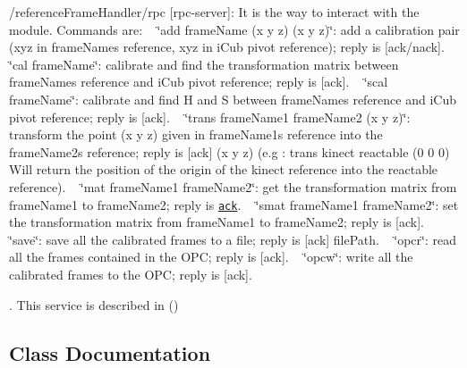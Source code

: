 \begin{DoxyItemize}
\item /reference\+Frame\+Handler/rpc \mbox{[}rpc-\/server\mbox{]}\+: It is the way to interact with the module. Commands are\+: ~\newline
 \char`\"{}add frame\+Name (x y z) (x\textquotesingle{} y\textquotesingle{} z\textquotesingle{})\char`\"{}\+: add a calibration pair (xyz in frame\+Name\textquotesingle{}s reference, x\textquotesingle{}y\textquotesingle{}z\textquotesingle{} in i\+Cub pivot reference); reply is \mbox{[}ack/nack\mbox{]}. ~\newline
 \char`\"{}cal frame\+Name\char`\"{}\+: calibrate and find the transformation matrix between frame\+Name\textquotesingle{}s reference and i\+Cub pivot reference; reply is \mbox{[}ack\mbox{]}. ~\newline
 \char`\"{}scal frame\+Name\char`\"{}\+: calibrate and find H and S between frame\+Name\textquotesingle{}s reference and i\+Cub pivot reference; reply is \mbox{[}ack\mbox{]}. ~\newline
 \char`\"{}trans frame\+Name1 frame\+Name2 (x y z)\char`\"{}\+: transform the point (x y z) given in frame\+Name1\textquotesingle{}s reference into the frame\+Name2\textquotesingle{}s reference; reply is \mbox{[}ack\mbox{]} (x\textquotesingle{} y\textquotesingle{} z\textquotesingle{}) (e.\+g \+: trans kinect reactable (0 0 0) Will return the position of the origin of the kinect reference into the reactable reference). ~\newline
 \char`\"{}mat frame\+Name1 frame\+Name2\char`\"{}\+: get the transformation matrix from frame\+Name1 to frame\+Name2; reply is \href{m00 m01 ... m32 m33}{\tt ack}. ~\newline
 \char`\"{}smat frame\+Name1 frame\+Name2\char`\"{}\+: set the transformation matrix from frame\+Name1 to frame\+Name2; reply is \mbox{[}ack\mbox{]}. ~\newline
 \char`\"{}save\char`\"{}\+: save all the calibrated frames to a file; reply is \mbox{[}ack\mbox{]} file\+Path. ~\newline
 \char`\"{}opcr\char`\"{}\+: read all the frames contained in the O\+PC; reply is \mbox{[}ack\mbox{]}. ~\newline
 \char`\"{}opcw\char`\"{}\+: write all the calibrated frames to the O\+PC; reply is \mbox{[}ack\mbox{]}.

. This service is described in () 
\end{DoxyItemize}

\subsection{Class Documentation}
\label{structFrameInfo}
